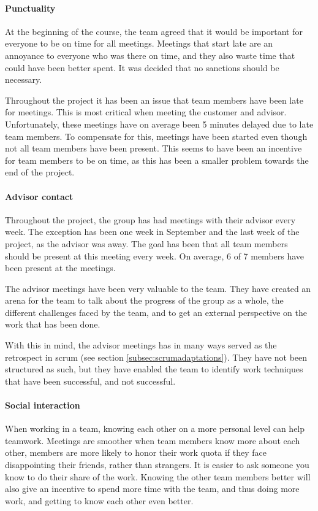 \documentclass[11pt,a4paper,titlepage,oneside]{report}
\begin{document}
\paragraph{Punctuality}
At the beginning of the course, the team agreed that it would be important for everyone to be on time for all meetings. Meetings that start late are an annoyance to everyone who was there on time, and they also waste time that could have been better spent. It was decided that no sanctions should be necessary.

Throughout the project it has been an issue that team members have been late for meetings. This is most critical when meeting the customer and advisor. Unfortunately, these meetings have on average been 5 minutes delayed due to late team members. To compensate for this, meetings have been started even though not all team members have been present. This seems to have been an incentive for team members to be on time, as this has been a smaller problem towards the end of the project. 

\paragraph{Advisor contact}
Throughout the project, the group has had meetings with their advisor every week. The exception has been one week in September and the last week of the project, as the advisor was away. The goal has been that all team members should be present at this meeting every week. On average, 6 of 7 members have been present at the meetings.

The advisor meetings have been very valuable to the team. They have created an arena for the team to talk about the progress of the group as a whole, the different challenges faced by the team, and to get an external perspective on the work that has been done. 

With this in mind, the advisor meetings has in many ways served as the retrospect in scrum (see section \ref{subsec:scrumadaptations}). They have not been structured as such, but they have enabled the team to identify work techniques that have been successful, and not successful. 

\paragraph{Social interaction}
When working in a team, knowing each other on a more personal level can help teamwork. Meetings are smoother when team members know more about each other, members are more likely to honor their work quota if they face disappointing their friends, rather than strangers. It is easier to ask someone you know to do their share of the work. Knowing the other team members better will also give an incentive to spend more time with the team, and thus doing more work, and getting to know each other even better. \cite{Effective:Teamwork}
\end{document}
